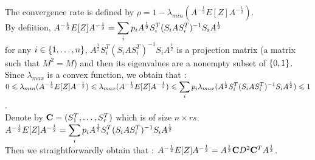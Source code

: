 The convergence rate is defined by $\rho = 1 - \lambda_{min}(A^{-\frac12}E[Z]A^{-\frac12}  )$.\\

By defiition, $A^{-\frac12}E[Z]A^{-\frac12} = \displaystyle\sum\limits_{i} p_{i} A^{\frac 12} S_{i}^{T} (S_{i}  A  S_{i}^{T})^{-1} S_{i} A^{\frac 12}$ \\
for any $i \in \left\{1,\dots,n\right\}$, $A^{\frac 12} S_{i}^{T} (S_{i}  A  S_{i}^{T})^{-1} S_{i} A^{\frac 12}$ is a projection matrix (a matrix such that $M^{2} = M$) and then its eigenvalues are a nonempty subset of $\left\{0,1\right\}$.\\

Since $\lambda_{max}$ is a convex function, we obtain that :\\

$0 \leqslant \lambda_{min}(A^{-\frac12}E[Z]A^{-\frac12}) \leqslant  \lambda_{max}(A^{-\frac12}E[Z]A^{-\frac12}) \leqslant \displaystyle\sum\limits_{i} p_{i} \lambda_{max}(A^{\frac 12} S_{i}^{T} (S_{i}  A  S_{i}^{T})^{-1} S_{i} A^{\frac 12}) \leqslant 1$.\\

Denote by $\bold{C} = (S_{1}^{T},\dots,S_{r}^{T})$ which is of size $ n \times r s$.\\
\pr
$A^{-\frac12}E[Z]A^{-\frac12} = \displaystyle\sum\limits_{i} p_{i} A^{\frac 12} S_{i}^{T} (S_{i}  A  S_{i}^{T})^{-1} S_{i} A^{\frac 12}$ \\
Then we straightforwardly obtain that : $A^{-\frac12}E[Z]A^{-\frac12} = A^{\frac 12} \bold{C} D^{2} \bold{C}^{T} A^{\frac 12}$.\\

